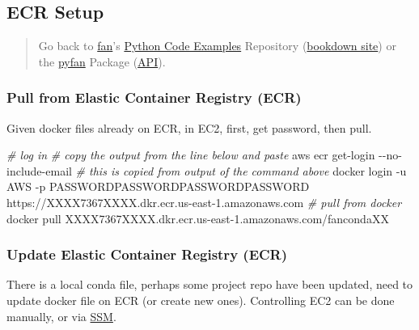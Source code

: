 \documentclass[
]{book}
\newenvironment{Shaded}{\begin{snugshade}}{\end{snugshade}}
\newcommand{\CommentTok}[1]{\textcolor[rgb]{0.56,0.35,0.01}{\textit{#1}}}
\newcommand{\ExtensionTok}[1]{#1}
\newcommand{\NormalTok}[1]{#1}
\begin{document}
\hypertarget{ecr-setup}{%
\subsection{ECR Setup}\label{ecr-setup}}

\begin{quote}
Go back to \href{http://fanwangecon.github.io/}{fan}'s \href{https://fanwangecon.github.io/Py4Econ/}{Python Code Examples} Repository (\href{https://fanwangecon.github.io/Py4Econ/bookdown}{bookdown site}) or the \href{https://pyfan.readthedocs.io/en/latest/}{pyfan} Package (\href{https://pyfan.readthedocs.io/en/latest/reference.html}{API}).
\end{quote}

\hypertarget{pull-from-elastic-container-registry-ecr}{%
\subsubsection{Pull from Elastic Container Registry (ECR)}\label{pull-from-elastic-container-registry-ecr}}

Given docker files already on ECR, in EC2, first, get password, then pull.

\begin{Shaded}
\begin{Highlighting}[]
\CommentTok{\# log in}
\CommentTok{\# copy the output from the line below and paste}
\ExtensionTok{aws}\NormalTok{ ecr get{-}login {-}{-}no{-}include{-}email}
\CommentTok{\# this is copied from output of the command above}
\ExtensionTok{docker}\NormalTok{ login {-}u AWS {-}p PASSWORDPASSWORDPASSWORDPASSWORD https://XXXX7367XXXX.dkr.ecr.us{-}east{-}1.amazonaws.com}
\CommentTok{\# pull from docker}
\ExtensionTok{docker}\NormalTok{ pull XXXX7367XXXX.dkr.ecr.us{-}east{-}1.amazonaws.com/fancondaXX}
\end{Highlighting}
\end{Shaded}

\hypertarget{update-elastic-container-registry-ecr}{%
\subsubsection{Update Elastic Container Registry (ECR)}\label{update-elastic-container-registry-ecr}}

There is a local conda file, perhaps some project repo have been updated, need to update docker file on ECR (or create new ones). Controlling EC2 can be done manually, or via \href{https://docs.aws.amazon.com/systems-manager/latest/userguide/prereqs-ssm-agent.html}{SSM}.
\end{document}
